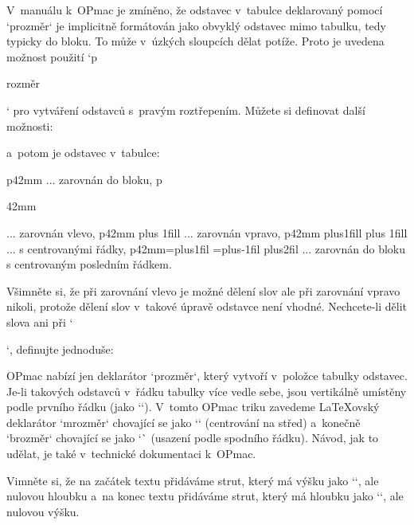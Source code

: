 


V~manuálu k~OPmac je zmíněno, že odstavec v~tabulce deklarovaný pomocí `p{rozměr}` je implicitně formátován jako obvyklý odstavec mimo tabulku, tedy typicky do bloku. To může v~úzkých sloupcích dělat potíže. Proto je uvedena možnost použití `p{rozměr\raggedright}` pro vytváření odstavců s~pravým roztřepením. Můžete si definovat další možnosti: 

\begtt
\let\fL=\raggedright 
\def\fR{\leftskip=0pt plus 1fill} 
\def\fC{\leftskip=0pt plus1fill \rightskip=0pt plus 1fill} 
\def\fX{\leftskip=\iindent plus1fil 
        \rightskip=\iindent plus-1fil 
        \parfillskip=0pt plus2fil} 
\endtt


a~potom je odstavec v~tabulce: 

\begtt
p{42mm}     ... zarovnán do bloku, 
p{42mm\fL}  ... zarovnán vlevo, 
p{42mm\fR}  ... zarovnán vpravo, 
p{42mm\fC}  ... s centrovanými řádky, 
p{42mm\fX}  ... zarovnán do bloku s centrovaným posledním řádkem. 
\endtt


Všimněte si, že při zarovnání vlevo je možné dělení slov ale při zarovnání vpravo nikoli, protože dělení slov v~takové úpravě odstavce není vhodné. Nechcete-li dělit slova ani při `\fL`, definujte jednoduše: 

\begtt
\def\fL{\rightskip=0pt plus 1fil} 
\endtt

 


OPmac nabízí jen deklarátor `p{rozměr}`, který vytvoří v~položce tabulky odstavec. Je-li takových odstavců v~řádku tabulky více vedle sebe, jsou vertikálně umístěny podle prvního řádku (jako `\vtop`). V~tomto OPmac triku zavedeme LaTeXovský deklarátor `m{rozměr}` chovající se jako `\vcenter` (centrování na střed) a~konečně `b{rozměr}` chovající se jako `\vbox` (usazení podle spodního řádku). Návod, jak to udělat, je také v~technické dokumentaci k~OPmac. 

\begtt
\def\paramtabdeclarem#1{\tabiteml{$\vcenter{\hsize=#1\relax 
   \baselineskip=\normalbaselineskip \lineskiplimit=0pt 
   \noindent\vbox{\hbox{\tabstrutA}\kern-\prevdepth}##\unsskip 
   \vbox to0pt{\vss\hbox{\tabstrutA}}}$}\tabitemr 
} 
\def\paramtabdeclareb#1{\tabiteml\vbox{\hsize=#1\relax 
   \baselineskip=\normalbaselineskip \lineskiplimit=0pt 
   \noindent\vbox{\hbox{\tabstrutA}\kern-\prevdepth}##\unsskip}\tabitemr 
} 
\endtt


Vimněte si, že na začátek textu přidáváme strut, který má výšku jako `\tabstrut`, ale nulovou hloubku a~na konec textu přidáváme strut, který má hloubku jako `\tabstrut`, ale nulovou výšku. 


